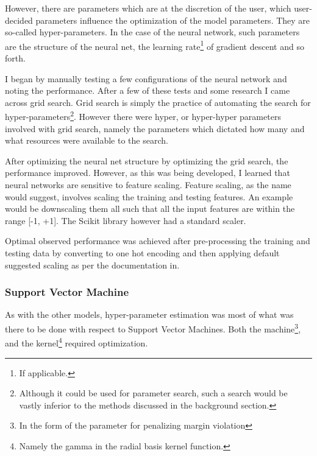 \documentclass[a4paper, 12pt]{article}
\begin{document}
                     \par However, there are parameters which are at the discretion of the user, which user-decided parameters influence the optimization of the model parameters. They are so-called hyper-parameters. In the case of the neural network, such parameters are the structure of the neural net, the learning rate\footnote{If applicable.} of gradient descent and so forth.
                     
                     \par I began by manually testing a few configurations of the neural network and noting the performance. After a few of these tests and some research I came across grid search. Grid search is simply the practice of automating the search for hyper-parameters\footnote{Although it could be used for parameter search, such a search would be vastly inferior to the methods discussed in the background section.}. However there were hyper, or hyper-hyper parameters involved with grid search, namely the parameters which dictated how many and what resources were available to the search. 
                     
                     \par After optimizing the neural net structure by optimizing the grid search, the performance improved. However, as this was being developed, I learned that neural networks are sensitive to feature scaling\cite{skNeuralNet}. Feature scaling, as the name would suggest, involves scaling the training and testing features. An example would be downscaling them all such that all the input features are within the range [-1, +1]. The Scikit library however had a standard scaler.
                     
                     \par Optimal observed performance was achieved after pre-processing the training and testing data by converting to one hot encoding and then applying default suggested scaling as per the documentation in\cite{skNeuralNet}.
                     
                    \subsubsection{Support Vector Machine}
                 
                     \par As with the other models, hyper-parameter estimation was most of what was there to be done with respect to Support Vector Machines. Both the machine\footnote{In the form of the parameter for penalizing margin violation}, and the kernel\footnote{Namely the gamma in the radial basis kernel function.} required optimization.
                     
\end{document}
